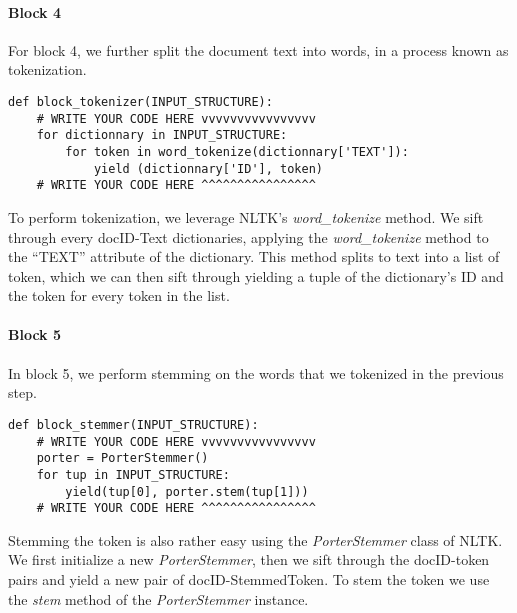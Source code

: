 \documentclass[]{report}
\begin{document}
\paragraph{Block 4}
For block 4, we further split the document text into words, in a process known as tokenization.
\begin{verbatim}
def block_tokenizer(INPUT_STRUCTURE):
	# WRITE YOUR CODE HERE vvvvvvvvvvvvvvvv
	for dictionnary in INPUT_STRUCTURE:
		for token in word_tokenize(dictionnary['TEXT']):
			yield (dictionnary['ID'], token)
	# WRITE YOUR CODE HERE ^^^^^^^^^^^^^^^^
\end{verbatim}
To perform tokenization, we leverage NLTK's \textit{word\_tokenize} method. We sift through every docID-Text dictionaries, applying the \textit{word\_tokenize} method to the ``TEXT'' attribute of the dictionary. This method splits to text into a list of token, which we can then sift through yielding a tuple of the dictionary's ID and the token for every token in the list.

\paragraph{Block 5}
In block 5, we perform stemming on the words that we tokenized in the previous step.
\begin{verbatim}
def block_stemmer(INPUT_STRUCTURE):
	# WRITE YOUR CODE HERE vvvvvvvvvvvvvvvv
	porter = PorterStemmer()
	for tup in INPUT_STRUCTURE:
		yield(tup[0], porter.stem(tup[1]))
	# WRITE YOUR CODE HERE ^^^^^^^^^^^^^^^^
\end{verbatim}
Stemming the token is also rather easy using the \textit{PorterStemmer} class of NLTK. We first initialize a new \textit{PorterStemmer}, then we sift through the docID-token pairs and yield a new pair of docID-StemmedToken. To stem the token we use the \textit{stem} method of the \textit{PorterStemmer} instance.
\end{document}
